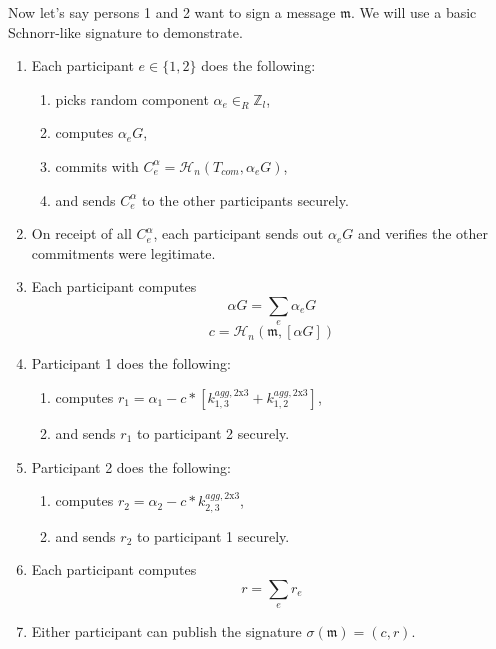Now let's say persons 1 and 2 want to sign a message $\mathfrak{m}$. We will use a basic Schnorr-like signature to demonstrate.
\begin{enumerate}
    \item Each participant $e \in \{1,2\}$ does the following:
    \begin{enumerate}
        \item picks random component $\alpha_e \in_R \mathbb{Z}_l$,
        \item computes $\alpha_e G$,
        \item commits with $C^{\alpha}_{e} = \mathcal{H}_n(T_{com},\alpha_e G)$,
        \item and sends $C^{\alpha}_{e}$ to the other participants securely.
    \end{enumerate}
    \item On receipt of all $C^{\alpha}_{e}$, each participant sends out $\alpha_e G$ and verifies the other commitments were legitimate.
    \item Each participant computes 
    \[\alpha G = \sum_e \alpha_e G\]
    \[c = \mathcal{H}_n(\mathfrak{m},[\alpha G])\]
    \item Participant 1 does the following:
    \begin{enumerate}
        \item computes $r_1 = \alpha_1 - c*[k^{agg,\textrm{2x3}}_{1,3} + k^{agg,\textrm{2x3}}_{1,2}]$,
        \item and sends $r_1$ to participant 2 securely.
    \end{enumerate}
    \item Participant 2 does the following:
    \begin{enumerate}
        \item computes $r_2 = \alpha_2 - c*k^{agg,\textrm{2x3}}_{2,3}$,
        \item and sends $r_2$ to participant 1 securely.
    \end{enumerate}
    \item Each participant computes 
    \[r = \sum_e r_e\]
    \item Either participant can publish the signature $\sigma(\mathfrak{m}) = (c,r)$.
\end{enumerate}

